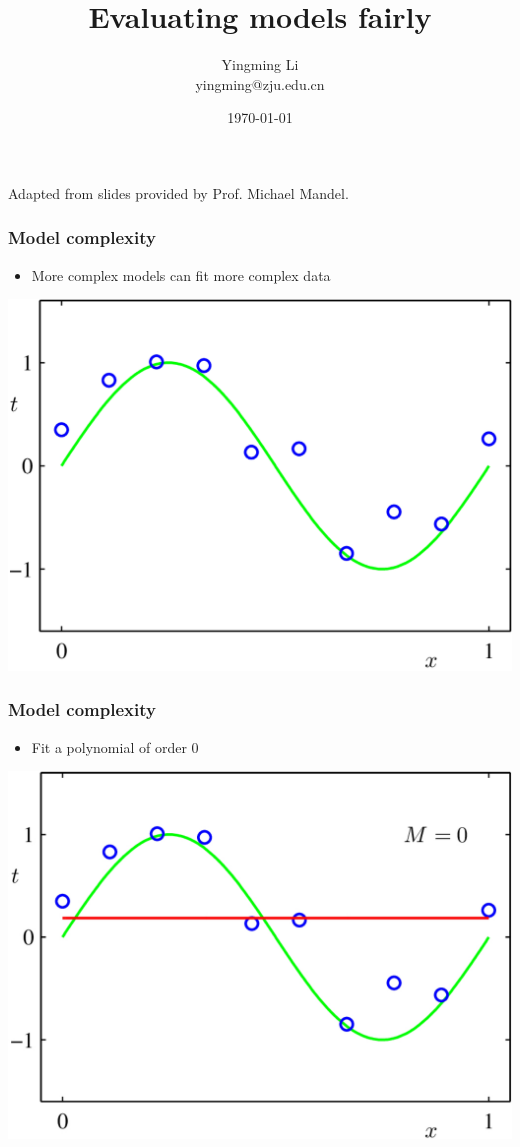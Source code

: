 \documentclass[12pt,notes,mathserif]{beamer}
\title[]{Evaluating models fairly}
\author[YingmingLi]{Yingming Li \\ yingming@zju.edu.cn}
\institute[DSERC, ZJU]{Data Science \& Engineering Research Center, ZJU}
\date[\today]{\today}
\begin{document}

\begin{frame}[c]
	\titlepage
	\begin{center}
		Adapted from slides provided by Prof.  Michael Mandel.		
	\end{center}
\end{frame}

\begin{frame}[c]
\frametitle{Model complexity}
\begin{itemize}
\item More complex models can fit more complex data
\end{itemize}
\begin{center}
\includegraphics[width=0.61\linewidth]{fig/lec52.jpg}
\end{center}
\end{frame}
\begin{frame}[c]
\frametitle{Model complexity}
\begin{itemize}
\item Fit a polynomial of order 0
\end{itemize}
\begin{center}
\includegraphics[width=0.61\linewidth]{fig/lec53.jpg}
\end{center}
\end{frame}
\end{document}
